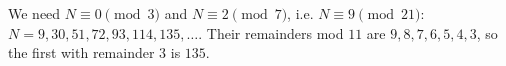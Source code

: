 We need $N\equiv0\pmod3$ and $N\equiv2\pmod7$, i.e. $N\equiv9\pmod{21}$: $N=9,30,51,72,93,114,135,\dots$. Their remainders mod $11$ are $9,8,7,6,5,4,3$, so the first with remainder $3$ is $\boxed{135}$.
